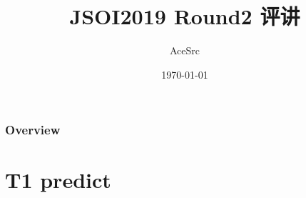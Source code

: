 \documentclass{beamer}
\title[Short title]{JSOI2019 Round2 评讲} %
\author{AceSrc} %
\institute[] %
{
\medskip
\textit{AceSrc@outlook.com} %
}
\date{\today} %
\begin{document}
\begin{frame}
\titlepage %
\end{frame}

\begin{frame}
\frametitle{Overview} %
\tableofcontents %
\end{frame}


\section{T1 predict} %

\end{document}
